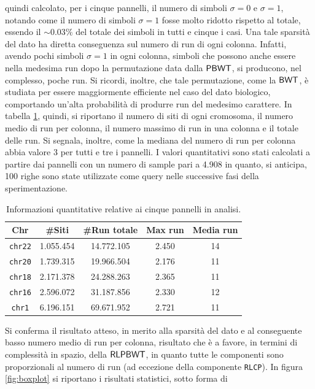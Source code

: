 quindi calcolato, per i cinque pannelli, il numero di simboli $\sigma=0$ e
$\sigma=1$, notando come il numero di simboli $\sigma=1$ fosse molto ridotto
rispetto al totale, essendo il $\sim 0.03\%$ del totale dei simboli in tutti e
cinque i casi. Una tale
sparsità del dato ha diretta conseguenza sul numero di run di ogni
colonna. Infatti, avendo 
pochi simboli $\sigma=1$ in ogni colonna, simboli che possono anche
essere nella medesima run dopo la permutazione data dalla
$\mbox{\rm {\sf PBWT}}$, si producono, nel complesso, poche run. Si ricordi, inoltre, che tale
permutazione, come la 
$\mbox{\rm {\sf BWT}}$, è studiata per essere 
maggiormente efficiente nel caso del dato biologico, comportando un'alta
probabilità di produrre run del medesimo carattere. In tabella \ref{tab:panel},
quindi, si riportano il numero di siti di ogni cromosoma, il 
numero medio di run per colonna, il numero 
massimo di run in una colonna e il totale delle run. Si segnala, inoltre,
come la
mediana del numero di run per colonna abbia valore 3 per tutti e tre i pannelli.
I valori quantitativi sono 
stati calcolati a partire dai pannelli con un numero di sample pari a 4.908 in
quanto, si anticipa, 100 righe sono state utilizzate come query nelle successive
fasi della sperimentazione.
\begin{table}
  \centering
  \caption{Informazioni quantitative relative ai cinque pannelli in analisi.}
  \label{tab:panel}
  \begin{tabular}{c||c|c|c|c}
    \textbf{Chr} & \textbf{\#Siti} & \textbf{\#Run totale}
    & \textbf{Max run} & \textbf{Media run} \\ 
    \hline
    \texttt{chr22} & 1.055.454 & 14.772.105 & 2.450 & 14\\
    \texttt{chr20} & 1.739.315 & 19.966.504 & 2.176 & 11\\
    \texttt{chr18} & 2.171.378 & 24.288.263 & 2.365 & 11\\
    \texttt{chr16} & 2.596.072 & 31.187.856 & 2.330 & 12\\
    \texttt{chr1} & 6.196.151 & 69.671.952 & 2.721 & 11\\
  \end{tabular}
\end{table}
Si conferma il risultato atteso, in merito alla sparsità del dato e al
conseguente basso numero medio di run per colonna, risultato che è a favore, in
termini di 
complessità in spazio, della $\mbox{\rm {\sf RLPBWT}}$, in quanto tutte le componenti sono
proporzionali al numero di run (ad eccezione della componente \texttt{RLCP}). In
figura 
\ref{fig:boxplot} si riportano i risultati statistici, sotto forma di
